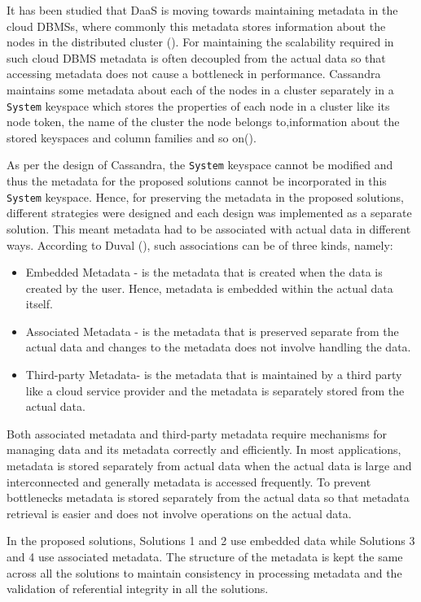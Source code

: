 It has been studied that \ac{DaaS} is moving towards maintaining metadata in the
cloud \acp{DBMS}, where commonly this metadata stores information about the
nodes in the distributed cluster ().  For  maintaining the
scalability required in such cloud \ac{DBMS} metadata is often decoupled from
the actual data so that accessing metadata does not cause a bottleneck in
performance.  Cassandra maintains some metadata about each of the nodes in a
cluster separately in a \texttt{System} keyspace which stores the properties of
each node in a cluster like its node token, the name of the cluster the node
belongs to,information about the stored keyspaces and column families and so
on(). 

As per the design of Cassandra, the \texttt{System} keyspace cannot be modified
and thus  the metadata for the proposed solutions cannot be incorporated in this
\texttt{System} keyspace.  Hence, for preserving the metadata in the
proposed solutions, different strategies were designed
and each design was implemented as a separate solution.  This meant metadata had
to be associated with actual data in different ways.  According to Duval
(), such associations can be of three kinds, namely:

\begin{itemize}
  \item Embedded Metadata - is the metadata that is created when the data is
  created by the user.  Hence, metadata is embedded within the actual data
  itself. 
  \item Associated Metadata -  is the metadata that is preserved separate from
  the actual data and changes to the metadata does not involve handling the
  data. 
  \item Third-party Metadata- is the metadata that is maintained by a third
  party like a cloud service provider and the metadata is separately stored from
  the actual data. 
\end{itemize}
Both associated metadata and third-party metadata require mechanisms for
managing  data and its metadata correctly and efficiently.  In most applications,
metadata is stored separately from actual data when the actual data is large
and interconnected and generally metadata is accessed frequently.  To prevent
bottlenecks metadata is stored separately from the actual data so that
metadata retrieval is easier and does not involve operations on the actual
data. 

In the proposed solutions, Solutions 1 and 2  use embedded data while Solutions
3 and 4 use associated metadata.  The structure of the metadata is kept the same
across all the solutions to maintain consistency in processing metadata and the
validation of referential integrity in all the solutions.  

